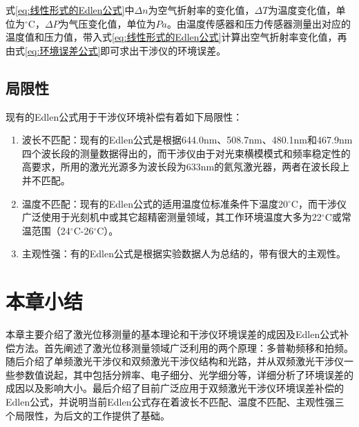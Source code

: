 式\eqref{eq:线性形式的Edlen公式}中\(\Delta n\)为空气折射率的变化值，\(\Delta T\)为温度变化值，单位为$^{\circ}$C，\(\Delta P\)为气压变化值，单位为\(Pa\)。由温度传感器和压力传感器测量出对应的温度值和压力值，带入式\eqref{eq:线性形式的Edlen公式}计算出空气折射率变化值，再由式\eqref{eq:环境误差公式}即可求出干涉仪的环境误差。
\subsection{局限性}
现有的Edlen公式用于干涉仪环境补偿有着如下局限性：
\begin{enumerate}
  \item 波长不匹配：现有的Edlen公式是根据644.0nm、508.7nm、480.1nm和467.9nm四个波长段的测量数据得出的\cite{2020Effect}，而干涉仪由于对光束横模模式和频率稳定性的高要求，所用的激光光源多为波长段为633nm的氦氖激光器，两者在波长段上并不匹配。
  \item 温度不匹配：现有的Edlen公式的适用温度位标准条件下温度20$^{\circ}$C\cite{2020Effect}，而干涉仪广泛使用于光刻机中或其它超精密测量领域，其工作环境温度大多为22$^{\circ}$C或常温范围（24$^{\circ}$C-26$^{\circ}$C）。
  \item 主观性强：有的Edlen公式是根据实验数据人为总结的，带有很大的主观性。
\end{enumerate}


\section{本章小结}
本章主要介绍了激光位移测量的基本理论和干涉仪环境误差的成因及Edlen公式补偿方法。首先阐述了激光位移测量领域广泛利用的两个原理：多普勒频移和拍频。随后介绍了单频激光干涉仪和双频激光干涉仪结构和光路，并从双频激光干涉仪一些参数值说起，其中包括分辨率、电子细分、光学细分等，详细分析了环境误差的成因以及影响大小。最后介绍了目前广泛应用于双频激光干涉仪环境误差补偿的Edlen公式，并说明当前Edlen公式存在着波长不匹配、温度不匹配、主观性强三个局限性，为后文的工作提供了基础。